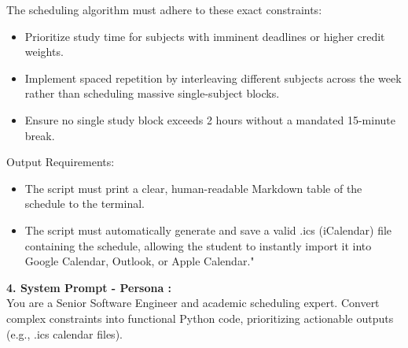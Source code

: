 \documentclass{article}
\begin{document}
The scheduling algorithm must adhere to these exact constraints:
\begin{itemize}
\item\hspace*{15pt} Prioritize study time for subjects with imminent deadlines or higher credit weights.
\item\hspace*{15pt} Implement spaced repetition by interleaving different subjects across the week rather than scheduling massive single-subject blocks.
\item\hspace*{15pt} Ensure no single study block exceeds 2 hours without a mandated 15-minute break.
\end{itemize}
Output Requirements:
\begin{itemize}
\item\hspace*{15pt} The script must print a clear, human-readable Markdown table of the schedule to the terminal.
\item\hspace*{15pt} The script must automatically generate and save a valid .ics (iCalendar) file containing the schedule, allowing the student to instantly import it into Google Calendar, Outlook, or Apple Calendar."
\end{itemize}
\textbf{4. System Prompt - Persona :}\\
\hspace*{15pt}You are a Senior Software Engineer and academic scheduling expert.
Convert complex constraints into functional Python code, prioritizing actionable outputs (e.g., .ics calendar files).
\end{document}
